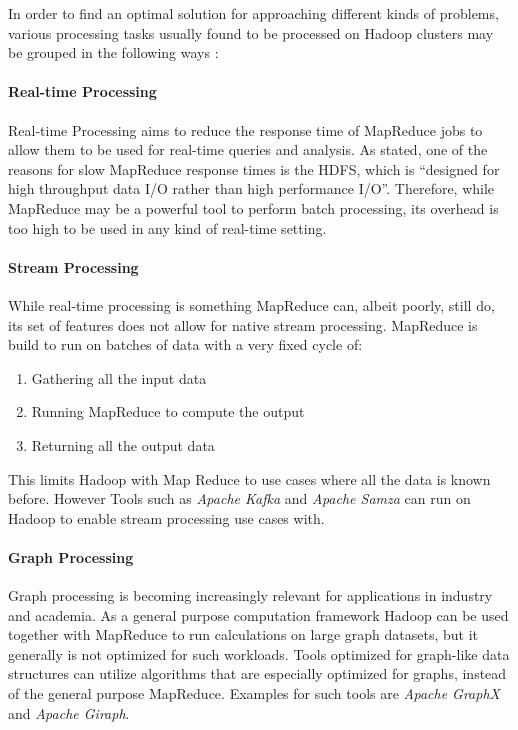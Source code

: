 In order to find an optimal solution for approaching different kinds of problems, various processing tasks usually found to be processed on Hadoop clusters may be grouped in the following ways \autocite{computers3040117}:

\paragraph{Real-time Processing}
Real-time Processing aims to reduce the response time of MapReduce jobs to allow them to be used for real-time queries and analysis. As \autocite{computers3040117} stated, one of the reasons for slow MapReduce response times is the \ac{HDFS}, which is \enquote{designed for high throughput data I/O rather than high performance I/O}.
Therefore, while MapReduce may be a powerful tool to perform batch processing, its overhead is too high to be used in any kind of real-time setting.\autocite{computers3040117}

\paragraph{Stream Processing}
While real-time processing is something MapReduce can, albeit poorly, still do, its set of features does not allow for native stream processing. MapReduce is build to run on batches of data with a very fixed cycle of:
\begin{enumerate}
    \item Gathering all the input data
    \item Running MapReduce to compute the output
    \item Returning all the output data
\end{enumerate}
This limits Hadoop with Map Reduce to use cases where all the data is known before.
However Tools such as \emph{Apache Kafka} and \emph{Apache Samza} can run on Hadoop to enable stream processing use cases with.

\paragraph{Graph Processing}
Graph processing is becoming increasingly relevant for
applications in industry and academia. 
As a general purpose computation framework Hadoop 
can be used together with MapReduce to run calculations 
on large graph datasets, 
but it generally is not optimized for such workloads.\autocite[][]{Capota:2015:GBD:2764947.2764954} 
Tools optimized for graph-like data structures can utilize algorithms that are especially optimized for graphs, instead of the general purpose MapReduce.
Examples for such tools are \emph{Apache GraphX} and \emph{Apache Giraph}.

